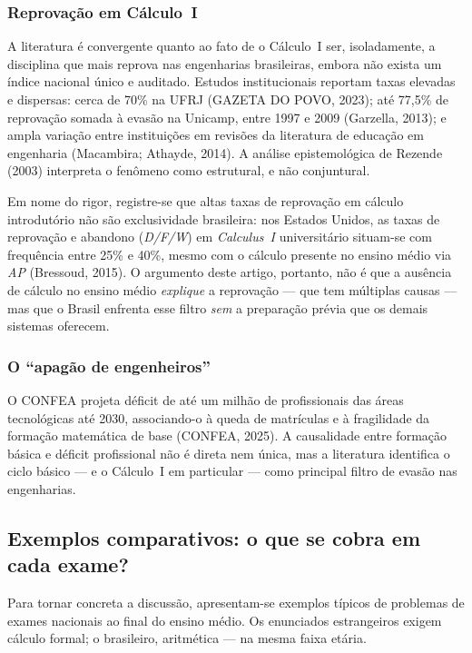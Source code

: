 \documentclass[12pt,a4paper,oneside]{article}
\begin{document}
\subsubsection{Reprovação em Cálculo~I}

A literatura é convergente quanto ao fato de o Cálculo~I ser, isoladamente,
a disciplina que mais reprova nas engenharias brasileiras, embora não
exista um índice nacional único e auditado. Estudos institucionais
reportam taxas elevadas e dispersas: cerca de 70\% na UFRJ (GAZETA DO
POVO, 2023); até 77,5\% de reprovação somada à evasão na Unicamp, entre
1997 e 2009 (Garzella, 2013); e ampla variação entre instituições em
revisões da literatura de educação em engenharia (Macambira; Athayde,
2014). A análise epistemológica de Rezende (2003) interpreta o fenômeno
como estrutural, e não conjuntural.

Em nome do rigor, registre-se que altas taxas de reprovação em cálculo
introdutório não são exclusividade brasileira: nos Estados Unidos, as
taxas de reprovação e abandono (\emph{D/F/W}) em \emph{Calculus~I}
universitário situam-se com frequência entre 25\% e 40\%, mesmo com o
cálculo presente no ensino médio via \emph{AP} (Bressoud, 2015). O
argumento deste artigo, portanto, não é que a ausência de cálculo no
ensino médio \emph{explique} a reprovação --- que tem múltiplas causas
--- mas que o Brasil enfrenta esse filtro \emph{sem} a preparação prévia
que os demais sistemas oferecem.

\subsubsection{O ``apagão de engenheiros''}

O CONFEA projeta déficit de até um milhão de profissionais das áreas
tecnológicas até 2030, associando-o à queda de matrículas e à fragilidade
da formação matemática de base (CONFEA, 2025). A causalidade entre
formação básica e déficit profissional não é direta nem única, mas a
literatura identifica o ciclo básico --- e o Cálculo~I em particular ---
como principal filtro de evasão nas engenharias.

\subsection{Exemplos comparativos: o que se cobra em cada exame?}

Para tornar concreta a discussão, apresentam-se exemplos típicos de
problemas de exames nacionais ao final do ensino médio. Os enunciados
estrangeiros exigem cálculo formal; o brasileiro, aritmética --- na mesma
faixa etária.
\end{document}
